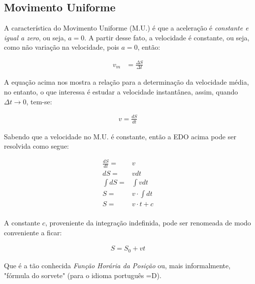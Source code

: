 \subsection{Movimento Uniforme}

A característica do Movimento Uniforme (M.U.) é que a aceleração é \textit{constante e igual a zero}, ou seja, $a=0$. A partir desse fato, a velocidade é constante, ou seja, como não variação na velocidade, pois $a=0$, então:

\begin{ceqn}
    \begin{align*}
        v_m &= \frac{\Delta S}{\Delta t}
    \end{align*}
\end{ceqn}

A equação acima nos mostra a relação para a determinação da velocidade média, no entanto, o que interessa é estudar a velocidade instantânea, assim, quando $\Delta t \rightarrow 0$, tem-se:

\begin{ceqn}
    \begin{align*}
        v = \frac{dS}{dt}
    \end{align*}
\end{ceqn}

Sabendo que a velocidade no M.U. é constante, então a EDO acima pode ser resolvida como segue:

\begin{ceqn}
    \begin{align*}
        \frac{dS}{dt} =& v \\
        dS =& v dt \\
        \int dS =& \int v dt \\
        S =& v \cdot \int dt \\
        S =& v \cdot t + c \\
    \end{align*}
\end{ceqn}

A constante $c$, proveniente da integração indefinida, pode ser renomeada de modo conveniente a ficar:

\begin{ceqn}
    \begin{align*}
        S = S_0 + vt
    \end{align*}
\end{ceqn}

Que é a tão conhecida \textit{Função Horária da Posição} ou, mais informalmente, "fórmula do sorvete" (para o idioma português =D).


